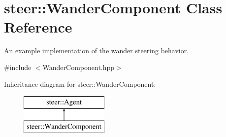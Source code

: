 \hypertarget{classsteer_1_1_wander_component}{\section{steer\-:\-:Wander\-Component Class Reference}
\label{classsteer_1_1_wander_component}
}


An example implementation of the wander steering behavior.  




{\ttfamily \#include $<$Wander\-Component.\-hpp$>$}

Inheritance diagram for steer\-:\-:Wander\-Component\-:\begin{figure}[H]
\begin{center}
\leavevmode
\includegraphics[height=2.000000cm]{classsteer_1_1_wander_component}
\end{center}
\end{figure}
